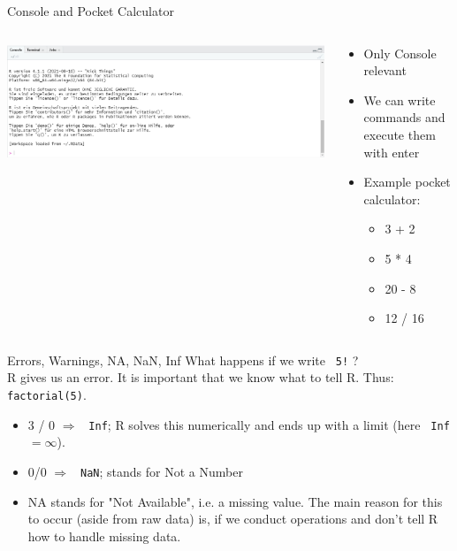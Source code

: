 \documentclass[xcolor=dvipsnames, aspectratio = 169]{beamer}
\begin{document}
\begin{frame}{Console and Pocket Calculator}
	\begin{columns}[T]
	\begin{column}{0.6\textwidth}
	\includegraphics[width=\textwidth]{Rstudio_interface_c}
	\end{column}
	\begin{column}{0.4\textwidth}
	\begin{itemize}
		\item Only \glqq Console\grqq{} relevant
		\item We can write commands and execute them with enter
		\item Example pocket calculator:
		\begin{itemize}
			\item 3 + 2
			\item 5 * 4
			\item 20 - 8
			\item 12 / 16
		\end{itemize}
	\end{itemize}
	\end{column}
\end{columns}
\end{frame}

\begin{frame}[fragile]{Errors, Warnings, NA, NaN, Inf}
	What happens if we write \verb+ 5!+ ? \\
	R gives us an error. It is important that we know what to tell R. Thus: \verb+ factorial(5)+. \\
	\begin{itemize}
		\item 3 / 0 $\Rightarrow$ \verb+ Inf+; R solves this numerically and ends up with a limit (here \verb+ Inf+ $=\infty$).
		\item 0/0 $\Rightarrow$ \verb+ NaN+; stands for \glqq Not a Number\grqq{}
		\item NA stands for "Not Available", i.e. a missing value. The main reason for this to occur (aside from raw data) is, if we conduct operations and don't tell R how to handle missing data.
	\end{itemize}

\end{frame}
\end{document}

